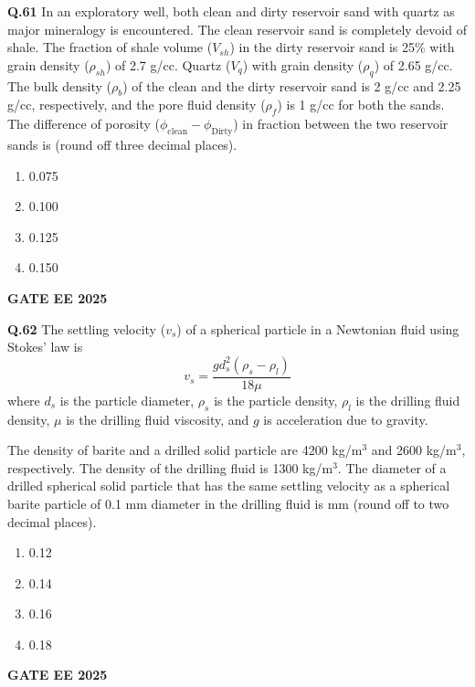 \documentclass{article}
\begin{document}
\vspace{0.5cm}

\textbf{Q.61} In an exploratory well, both clean and dirty reservoir sand with quartz as major mineralogy is encountered. The clean reservoir sand is completely devoid of shale. The fraction of shale volume ($V_{sh}$) in the dirty reservoir sand is 25\% with grain density ($\rho_{sh}$) of 2.7 g/cc. Quartz ($V_q$) with grain density ($\rho_q$) of 2.65 g/cc. The bulk density ($\rho_b$) of the clean and the dirty reservoir sand is 2 g/cc and 2.25 g/cc, respectively, and the pore fluid density ($\rho_f$) is 1 g/cc for both the sands. The difference of porosity ($\phi_{\text{clean}} - \phi_{\text{Dirty}}$) in fraction between the two reservoir sands is \underline{\hspace{1cm}} (round off three decimal places).
\begin{enumerate}[label=(\Alph*)]
    \item 0.075
    \item 0.100
    \item 0.125
    \item 0.150
\end{enumerate}
\textbf{GATE EE 2025}

\vspace{0.5cm}

\textbf{Q.62} The settling velocity ($v_s$) of a spherical particle in a Newtonian fluid using Stokes' law is
\[
v_s = \frac{g d_s^2 (\rho_s - \rho_l)}{18 \mu}
\]
where $d_s$ is the particle diameter, $\rho_s$ is the particle density, $\rho_l$ is the drilling fluid density, $\mu$ is the drilling fluid viscosity, and $g$ is acceleration due to gravity.

The density of barite and a drilled solid particle are 4200 kg/m$^3$ and 2600 kg/m$^3$, respectively. The density of the drilling fluid is 1300 kg/m$^3$. The diameter of a drilled spherical solid particle that has the same settling velocity as a spherical barite particle of 0.1 mm diameter in the drilling fluid is \underline{\hspace{1cm}} mm (round off to two decimal places).
\begin{enumerate}[label=(\Alph*)]
    \item 0.12
    \item 0.14
    \item 0.16
    \item 0.18
\end{enumerate}
\textbf{GATE EE 2025}

\vspace{0.5cm}
\end{document}
